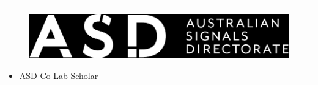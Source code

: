 \hrule
  \begin{minipage}{0.5\linewidth}
    \begin{figure}[h]
      \includegraphics[width=\linewidth]
        {Images/asd-logo.png}
    \end{figure}
  \end{minipage}
  \hfill
  \begin{minipage}{0.45\linewidth}
  \begin{itemize}
    \item ASD 
      \href{https://www.asd.gov.au/about/asd-anu-co-lab}{Co-Lab} 
      Scholar
  \end{itemize}
  \end{minipage}
